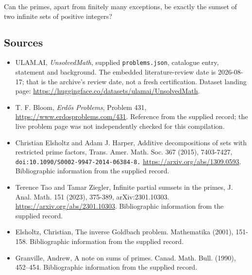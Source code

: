 \documentclass[11pt,a4paper]{article}
\begin{document}
Can the primes, apart from finitely many exceptions, be exactly the sumset of two infinite sets of positive integers?

\subsection{Sources}

{\small

\begin{itemize}

\item[\hypertarget{source:statement:1}{S1}] ULAM.AI, \emph{UnsolvedMath}, supplied \texttt{problems.json}, catalogue entry, statement and background. The embedded literature-review date is 2026-08-17; that is the archive’s review date, not a fresh certification. Dataset landing page: \url{https://huggingface.co/datasets/ulamai/UnsolvedMath}.

\item[\hypertarget{source:statement:2}{S2}] T. F. Bloom, \emph{Erdős Problems}, Problem 431, \url{https://www.erdosproblems.com/431}. Reference from the supplied record; the live problem page was not independently checked for this compilation.

\item[\hypertarget{source:statement:3}{S3}] Christian Elsholtz and Adam J. Harper, Additive decompositions of sets with restricted prime factors, Trans. Amer. Math. Soc. 367 (2015), 7403-7427, \nolinkurl{doi:10.1090/S0002-9947-2014-06384-8.} \url{https://arxiv.org/abs/1309.0593}. Bibliographic information from the supplied record.

\item[\hypertarget{source:statement:4}{S4}] Terence Tao and Tamar Ziegler, Infinite partial sumsets in the primes, J. Anal. Math. 151 (2023), 375-389, arXiv:2301.10303. \url{https://arxiv.org/abs/2301.10303}. Bibliographic information from the supplied record.

\item[\hypertarget{source:statement:5}{S5}] Elsholtz, Christian, The inverse Goldbach problem. Mathematika (2001), 151-158. Bibliographic information from the supplied record.

\item[\hypertarget{source:statement:6}{S6}] Granville, Andrew, A note on sums of primes. Canad. Math. Bull. (1990), 452--454. Bibliographic information from the supplied record.

\end{itemize}

}

\label{end:statement}
\end{document}
